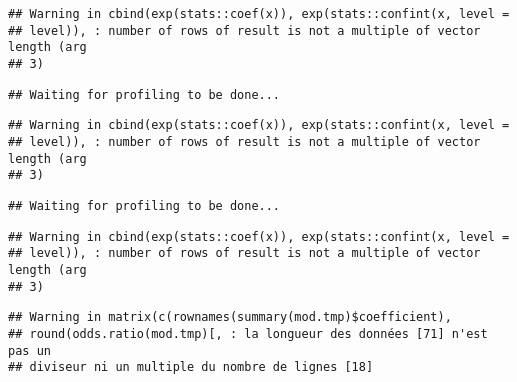 \documentclass[]{article}
\newenvironment{Shaded}{\begin{snugshade}}{\end{snugshade}}
\newcommand{\KeywordTok}[1]{\textcolor[rgb]{0.13,0.29,0.53}{\textbf{#1}}}
\newcommand{\DataTypeTok}[1]{\textcolor[rgb]{0.13,0.29,0.53}{#1}}
\newcommand{\StringTok}[1]{\textcolor[rgb]{0.31,0.60,0.02}{#1}}
\newcommand{\OperatorTok}[1]{\textcolor[rgb]{0.81,0.36,0.00}{\textbf{#1}}}
\newcommand{\NormalTok}[1]{#1}
\begin{document}
\begin{verbatim}
## Warning in cbind(exp(stats::coef(x)), exp(stats::confint(x, level =
## level)), : number of rows of result is not a multiple of vector length (arg
## 3)
\end{verbatim}

\begin{verbatim}
## Waiting for profiling to be done...
\end{verbatim}

\begin{verbatim}
## Warning in cbind(exp(stats::coef(x)), exp(stats::confint(x, level =
## level)), : number of rows of result is not a multiple of vector length (arg
## 3)
\end{verbatim}

\begin{verbatim}
## Waiting for profiling to be done...
\end{verbatim}

\begin{verbatim}
## Warning in cbind(exp(stats::coef(x)), exp(stats::confint(x, level =
## level)), : number of rows of result is not a multiple of vector length (arg
## 3)
\end{verbatim}

\begin{verbatim}
## Warning in matrix(c(rownames(summary(mod.tmp)$coefficient),
## round(odds.ratio(mod.tmp)[, : la longueur des données [71] n'est pas un
## diviseur ni un multiple du nombre de lignes [18]
\end{verbatim}

\begin{Shaded}
\end{Shaded}
\end{document}
